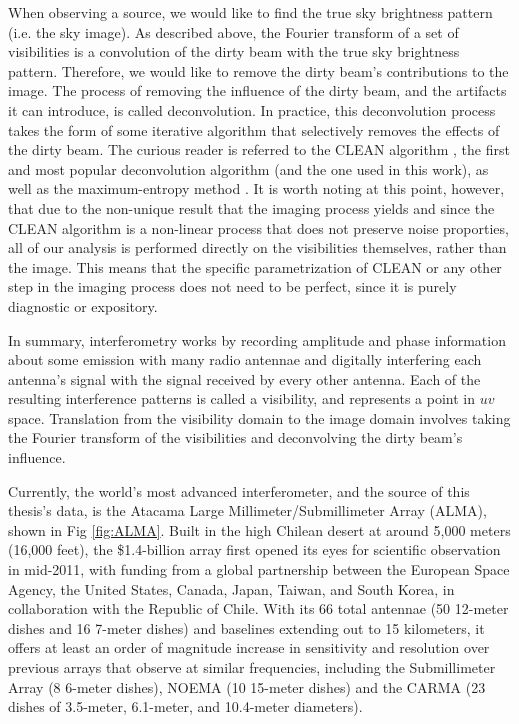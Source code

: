 When observing a source, we would like to find the true sky brightness pattern (i.e. the sky image). As described above, the Fourier transform of a set of visibilities is a convolution of the dirty beam with the true sky brightness pattern. Therefore, we would like to remove the dirty beam's contributions to the image. The process of removing the influence of the dirty beam, and the artifacts it can introduce, is called deconvolution. In practice, this deconvolution process takes the form of some iterative algorithm that selectively removes the effects of the dirty beam. The curious reader is referred to the CLEAN algorithm \citep{Hogbom1974}, the first and most popular deconvolution algorithm (and the one used in this work), as well as the maximum-entropy method \citep{Wernecke1977,SkillingBryan1984}. It is worth noting at this point, however, that due to the non-unique result that the imaging process yields and since the CLEAN algorithm is a non-linear process that does not preserve noise proporties, all of our analysis is performed directly on the visibilities themselves, rather than the image. This means that the specific parametrization of CLEAN or any other step in the imaging process does not need to be perfect, since it is purely diagnostic or expository.


In summary, interferometry works by recording amplitude and phase information about some emission with many radio antennae and digitally interfering each antenna's signal with the signal received by every other antenna. Each of the resulting interference patterns is called a visibility, and represents a point in $uv$ space. Translation from the visibility domain to the image domain involves taking the Fourier transform of the visibilities and deconvolving the dirty beam's influence.

Currently, the world's most advanced interferometer, and the source of this thesis's data, is the Atacama Large Millimeter/Submillimeter Array (ALMA), shown in Fig \ref{fig:ALMA}. Built in the high Chilean desert at around 5,000 meters (16,000 feet), the \$1.4-billion array first opened its eyes for scientific observation in mid-2011, with funding from a global partnership between the European Space Agency, the United States, Canada, Japan, Taiwan, and South Korea, in collaboration with the Republic of Chile. With its 66 total antennae (50 12-meter dishes and 16 7-meter dishes) and baselines extending out to 15 kilometers, it offers at least an order of magnitude increase in sensitivity and resolution over previous arrays that observe at similar frequencies, including the Submillimeter Array (8 6-meter dishes), NOEMA (10 15-meter dishes) and the CARMA (23 dishes of 3.5-meter, 6.1-meter, and 10.4-meter diameters).

